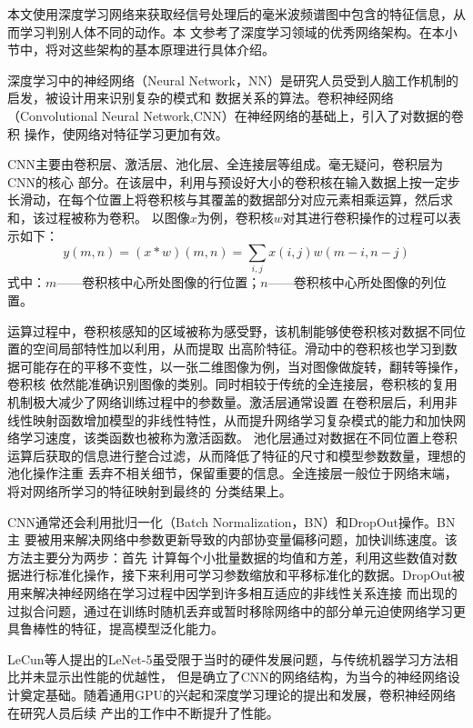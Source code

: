 本文使用深度学习网络来获取经信号处理后的毫米波频谱图中包含的特征信息，从而学习判别人体不同的动作。本
文参考了深度学习领域的优秀网络架构。在本小节中，将对这些架构的基本原理进行具体介绍。

深度学习中的神经网络（Neural Network，NN）是研究人员受到人脑工作机制的启发，被设计用来识别复杂的模式和
数据关系的算法。卷积神经网络（Convolutional Neural Network,CNN）在神经网络的基础上，引入了对数据的卷积
操作，使网络对特征学习更加有效。

CNN主要由卷积层、激活层、池化层、全连接层等组成。毫无疑问，卷积层为CNN的核心
部分。在该层中，利用与预设好大小的卷积核在输入数据上按一定步长滑动，在每个位置上将卷积核与其覆盖的数据部分对应元素相乘运算，然后求和，该过程被称为卷积。
以图像$x$为例，卷积核$w$对其进行卷积操作的过程可以表示如下：
\begin{equation}
    y(m,n)=(x*w)(m,n)=\sum_{i,j}x(i,j)w(m-i,n-j)
\end{equation}
式中：$m$——卷积核中心所处图像的行位置；$n$——卷积核中心所处图像的列位置。

运算过程中，卷积核感知的区域被称为感受野，该机制能够使卷积核对数据不同位置的空间局部特性加以利用，从而提取
出高阶特征。滑动中的卷积核也学习到数据可能存在的平移不变性，以一张二维图像为例，当对图像做旋转，翻转等操作，卷积核
依然能准确识别图像的类别。同时相较于传统的全连接层，卷积核的复用机制极大减少了网络训练过程中的参数量。激活层通常设置
在卷积层后，利用非线性映射函数增加模型的非线性特性，从而提升网络学习复杂模式的能力和加快网络学习速度，该类函数也被称为激活函数。
池化层通过对数据在不同位置上卷积运算后获取的信息进行整合过滤，从而降低了特征的尺寸和模型参数数量，理想的池化操作注重
丢弃不相关细节，保留重要的信息\cite{gholamalinezhad2020pooling}。全连接层一般位于网络末端，将对网络所学习的特征映射到最终的
分类结果上。

CNN通常还会利用批归一化\cite{ioffe2015batch}（Batch Normalization，BN）和DropOut\cite{srivastava2014dropout}操作。BN主
要被用来解决网络中参数更新导致的内部协变量偏移问题，加快训练速度。该方法主要分为两步：首先
计算每个小批量数据的均值和方差，利用这些数值对数据进行标准化操作，接下来利用可学习参数缩放和平移标准化的数据。DropOut被用来解决神经网络在学习过程中因学到许多相互适应的非线性关系连接
而出现的过拟合问题，通过在训练时随机丢弃或暂时移除网络中的部分单元迫使网络学习更具鲁棒性的特征，提高模型泛化能力。

LeCun等人\cite{lecun1998gradient}提出的LeNet-5虽受限于当时的硬件发展问题，与传统机器学习方法相比并未显示出性能的优越性，
但是确立了CNN的网络结构，为当今的神经网络设计奠定基础。随着通用GPU的兴起和深度学习理论的提出和发展，卷积神经网络在研究人员后续
产出的工作中不断提升了性能。

